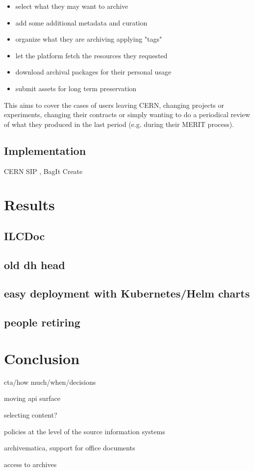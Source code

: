 \documentclass[11pt]{IEEEtran}
\begin{document}
\begin{itemize}
    \item select what they may want to archive 
    \item add some additional metadata and curation
    \item organize what they are archiving applying "tags"
    \item let the platform fetch the resources they requested 
    \item download archival packages for their personal usage
    \item submit assets for long term preservation
\end{itemize}

This aims to cover the cases of users leaving CERN, changing projects or experiments, changing their contracts or simply wanting to do a periodical review of what they produced in the last period (e.g. during their MERIT process).

\subsection{Implementation}

CERN SIP \cite{CERNDigitalMemorySIPSpecGitLab-2021-09-15}, BagIt Create \cite{CERNDigitalMemorybagitcreateGitLab-2023-02-17}

\section{Results}


\subsection{ILCDoc}

\subsection{old dh head}

\subsection{easy deployment with Kubernetes/Helm charts}

\subsection{people retiring}



\section{Conclusion}

cta/how much/when/decisions

moving api surface

selecting content?

policies at the level of the source information systems

archivematica, support for office documents

access to archives



\end{document}
